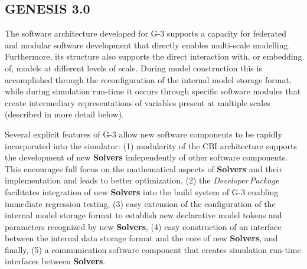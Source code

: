 \documentclass{article}
\begin{document}




\subsection{GENESIS 3.0}

The software architecture developed for G-3 supports a capacity for federated and modular software development that directly enables multi-scale modelling.  Furthermore, its structure also
supports the direct interaction with, or embedding of, models at different
levels of scale.  During model construction this is accomplished
through the reconfiguration of the internal model storage format,
while during simulation run-time it occurs through
specific software modules that create intermediary representations of
variables present at multiple scales (described in more detail below).

Several explicit features of G-3 allow
new software components to be rapidly incorporated into the simulator: (1) modularity of the CBI architecture supports the development of new {\bf Solvers} independently of
other software components. This encourages full focus on the mathematical
aspects of {\bf Solvers} and their implementation and leads to better
optimization, (2) the {\it Developer\,Package} facilitates integration of
new {\bf Solvers} into the build system of G-3 enabling immediate regression
testing, (3) easy extension of the configuration of the internal model
storage format to establish new declarative model tokens and
parameters recognized by new {\bf Solvers}, (4) easy construction of an
interface between the internal data storage format and the core of new
{\bf Solvers}, and finally, (5) a communication
software component that creates simulation run-time interfaces between {\bf Solvers}.
\end{document}
